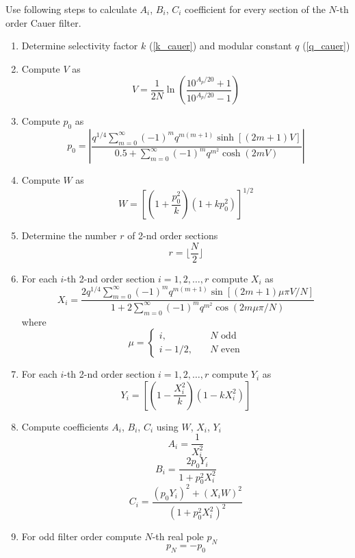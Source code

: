 Use following steps to calculate $A_i$, $B_i$, $C_i$ coefficient for every
section of the $N$-th order Cauer filter.

\begin{enumerate}
 \item Determine selectivity factor $k$ (\ref{k_cauer}) and modular constant $q$
(\ref{q_cauer})
\item Compute $V$ as
\begin{equation}
 V=\frac{1}{2N}\ln\left(\frac{10^{A_p/20}+1}{10^{A_p/20}-1}\right)
\end{equation}
\item Compute $p_0$ as
\begin{equation}
 p_0=\left|
     \frac{q^{1/4}\sum\limits_{m=0}^{\infty}(-1)^m q^{m(m+1)}\sinh[(2m+1)V]}
     {0.5+\sum\limits_{m=0}^{\infty}(-1)^m q^{m^2}\cosh(2mV)}\right|
\end{equation}
\item Compute $W$ as
\begin{equation}
 W=\left[\left(1+\frac{p^2_0}{k}\right)(1+k p_0^2)\right]^{1/2}
\end{equation}
\item Determine the number $r$ of 2-nd order sections
\begin{equation}
 r = \lfloor \frac{N}{2} \rfloor
\end{equation}
\item For each $i$-th 2-nd order section $i=1,2,\ldots,r$ compute $X_i$ as
\begin{equation}
 X_i=\frac{2q^{1/4}\sum\limits_{m=0}^{\infty}(-1)^m
     q^{m(m+1)}\sin[(2m+1)\mu\pi V/N]}
     {1+2\sum\limits_{m=0}^{\infty}(-1)^m q^{m^2}\cos(2m\mu\pi/N)}
\end{equation}
where 
\begin{equation}
 \mu=\left\lbrace \begin{array}{ll}
i, & \quad N \mbox{ odd} \\
i-1/2, & \quad N \mbox{ even} 
\end{array} \right.
\end{equation}
\item For each $i$-th 2-nd order section $i=1,2,\ldots,r$ compute $Y_i$ as
\begin{equation}
 Y_i=\left[\left(1-\frac{X_i^2}{k}\right)(1-kX_i^2)\right]
\end{equation}

\item Compute coefficients $A_i$, $B_i$, $C_i$ using $W$, $X_i$, $Y_i$
\begin{equation}
 A_i=\frac{1}{X_i^2}
\end{equation}
\begin{equation}
 B_i=\frac{2p_0Y_i}{1+p_0^2X_i^2}
\end{equation}
\begin{equation}
 C_i=\frac{(p_0Y_i)^2+(X_iW)^2}{(1+p_0^2X_i^2)^2}
\end{equation}

\item For odd filter order compute $N$-th real pole $p_N$
\begin{equation}
 p_N=-p_0
\end{equation}
\end{enumerate}

